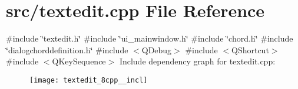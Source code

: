 \section{src/textedit.cpp File Reference}
\label{textedit_8cpp}
{\ttfamily \#include \char`\"{}textedit.\+h\char`\"{}}\newline
{\ttfamily \#include \char`\"{}ui\+\_\+mainwindow.\+h\char`\"{}}\newline
{\ttfamily \#include \char`\"{}chord.\+h\char`\"{}}\newline
{\ttfamily \#include \char`\"{}dialogchorddefinition.\+h\char`\"{}}\newline
{\ttfamily \#include $<$Q\+Debug$>$}\newline
{\ttfamily \#include $<$Q\+Shortcut$>$}\newline
{\ttfamily \#include $<$Q\+Key\+Sequence$>$}\newline
Include dependency graph for textedit.\+cpp\+:\nopagebreak
\begin{figure}[H]
\begin{center}
\leavevmode
\texttt{[image: textedit\_8cpp\_\_incl]}
\end{center}
\end{figure}
